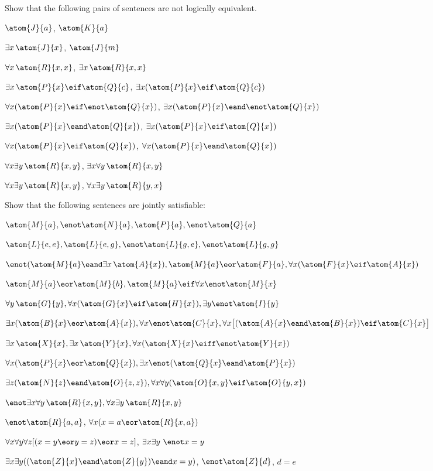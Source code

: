 \solutions
\problempart
\label{pr.NotEquiv}
Show that the following pairs of sentences are not logically equivalent.
\begin{earg}
\item $\atom{J}{a} $,  $\atom{K}{a}$
\item $\exists x\, \atom{J}{x}$,  $\atom{J}{m}$
\item $\forall x\, \atom{R}{x,x}$, $\exists x\, \atom{R}{x,x}$
\item $\exists x\, \atom{P}{x} \eif \atom{Q}{c}$, $\exists x (\atom{P}{x} \eif \atom{Q}{c})$
\item $\forall x(\atom{P}{x} \eif \enot \atom{Q}{x})$, $\exists x(\atom{P}{x} \eand \enot \atom{Q}{x})$
\item $\exists x(\atom{P}{x} \eand \atom{Q}{x})$, $\exists x(\atom{P}{x} \eif \atom{Q}{x})$
\item $\forall x(\atom{P}{x}\eif \atom{Q}{x})$, $\forall x(\atom{P}{x} \eand \atom{Q}{x})$
\item $\forall x\exists y\, \atom{R}{x,y}$, $\exists x\forall y\, \atom{R}{x,y}$
\item $\forall x\exists y\, \atom{R}{x,y}$, $\forall x\exists y\, \atom{R}{y,x}$
\end{earg}



\problempart
Show that the following sentences are jointly satisfiable:
\begin{earg}
\item  $\atom{M}{a}, \enot \atom{N}{a}, \atom{P}{a}, \enot \atom{Q}{a}$
\item $\atom{L}{e,e}, \atom{L}{e,g}, \enot \atom{L}{g,e}, \enot \atom{L}{g,g}$
\item $\enot (\atom{M}{a} \eand \exists x\, \atom{A}{x}), \atom{M}{a} \eor \atom{F}{a}, \forall x(\atom{F}{x} \eif \atom{A}{x})$
\item $\atom{M}{a} \eor \atom{M}{b}, \atom{M}{a} \eif \forall x \enot \atom{M}{x}$
\item $\forall y\, \atom{G}{y}, \forall x (\atom{G}{x} \eif \atom{H}{x}), \exists y \enot \atom{I}{y}$
\item $\exists x(\atom{B}{x} \eor \atom{A}{x}), \forall x \enot \atom{C}{x}, \forall x\bigl[(\atom{A}{x} \eand \atom{B}{x}) \eif \atom{C}{x}\bigr]$
\item $\exists x\, \atom{X}{x}, \exists x\, \atom{Y}{x}, \forall x(\atom{X}{x} \eiff \enot \atom{Y}{x})$
\item $\forall x(\atom{P}{x} \eor \atom{Q}{x}), \exists x\enot(\atom{Q}{x} \eand \atom{P}{x})$
\item $\exists z(\atom{N}{z} \eand \atom{O}{z,z}), \forall x\forall y(\atom{O}{x,y} \eif \atom{O}{y,x})$
\item $\enot \exists x \forall y\, \atom{R}{x,y}, \forall x \exists y\, \atom{R}{x,y}$
\item $\enot \atom{R}{a,a}$, $\forall x (x=a \eor \atom{R}{x,a})$
\item $\forall x\forall y\forall z[(x=y \eor y=z )\eor x=z]$, $\exists x\exists y\ \enot x= y$
\item $\exists x\exists y((\atom{Z}{x} \eand \atom{Z}{y} )\eand x=y)$, $\enot \atom{Z}{d}$, $d=e$
\end{earg}

